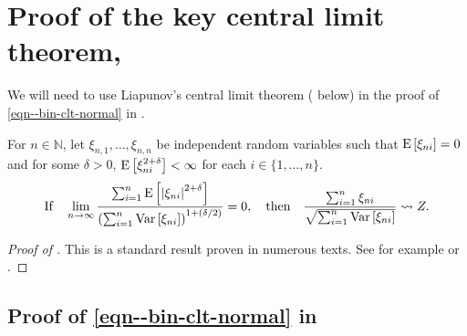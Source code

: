 
\section{Proof of the key central limit theorem,
\texorpdfstring{}{Theorem
\ref{thm--bin-clt-normal}}}
\label{sec--prf--thm--bin-clt-normal}

We will need to use Liapunov's central limit theorem (
below) in the proof of \eqref{eqn--bin-clt-normal} in
.

\begin{theorem}
\label{thm--liapunov-clt}
For \(n \in \mathbb{N}\), let \(\xi_{n, 1}, \dots, \xi_{n, n}\)
be independent random variables such that \(\mathrm{E} \left[ \xi_{n i} \right] = 0\)
and for some \(\delta > 0\), \(\mathrm{E} \left[ \xi_{n i}^{2 + \delta} \right] <
\infty\) for each \(i \in \{1, \dots, n\}\).
\begin{equation}
  \text{If} \quad \lim_{n \to \infty} \frac{\sum_{i = 1}^{n} \mathrm{E} \left[ \left|
  \xi_{n i} \right|^{2 + \delta} \right]}{\left( \sum_{i = 1}^{n} \mathrm{Var} \left[
  \xi_{n i} \right] \right)^{1 + (\delta / 2)}} = 0, \quad \text{then} \quad
  \frac{\sum_{i = 1}^{n} \xi_{n i}}{\sqrt{\sum_{i = 1}^{n} \mathrm{Var} \left[ \xi_{n i}
  \right]}} \rightsquigarrow Z.
  \label{eqn--liapunov-clt}
\end{equation}
\end{theorem}

\begin{proof}[Proof of ]
This is a standard result proven in numerous texts.
See for example \citet[Theorem 27.3, p. 362]{1995billingsleyProbabilityMeasure}
or \citet[Theorem 18 in Section 4 of Chapter III,
p. 51]{1984pollardConvergenceStochasticProcesses}.
\end{proof}

\subsection{Proof of
\texorpdfstring{\eqref{eqn--bin-clt-normal}}{(\ref{eqn--bin-clt-normal})}
in \texorpdfstring{}{Theorem
\ref{thm--bin-clt-normal}}}
\label{sec--prf--eqn--bin-clt-normal}

